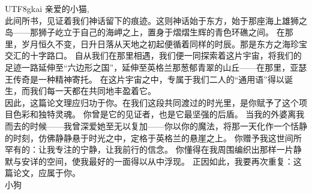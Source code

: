 \thispagestyle{empty}
{}

\vspace*{3cm}

\begin{CJK*}{UTF8}{gkai}
\noindent 亲爱的小猫, \\
此间所书，见证着我们神话留下的痕迹。这则神话始于东方，始于那座海上雄狮之岛——那狮子屹立于自己的海岬之上，置身于熠熠生辉的青色环礁之间。
在那里，岁月恒久不变，日升日落从天地之初起便循着同样的时辰。那是东方之海珍宝交汇的十字路口。
自从我们在那里相遇，我们便一同探索着这片宇宙，将我们的足迹一路延伸至“六边形之国”，延伸至英格兰那葱郁青翠的山丘——在那里，亚瑟王传奇是一种精神寄托。
在这片宇宙之中，专属于我们二人的“通用语”得以诞生，而我们每一天都在共同地丰盈着它。\\

因此，这篇论文理应归功于你。在我们这段共同渡过的时光里，是你赋予了这个项目色彩和独特灵魂。
你曾是它的见证者，也是它最坚强的后盾。
当我的外婆离我而去的时候——我曾深爱她至无以复加——你以你的魔法，将那一天化作一个恬静的时刻，仿佛静静悬于时光之中，定格于英格兰的悬崖之上。
你赠予我这世间所罕有的：让我专注的宁静，让我前行的信念。
你懂得在我周围编织出那样一片静默与安详的空间，使我最好的一面得以从中浮现。
正因如此，我要再次重复：这篇论文，应属于你。
\\ \medskip
\hspace*{\fill} 小狗 \\
\end{CJK*}